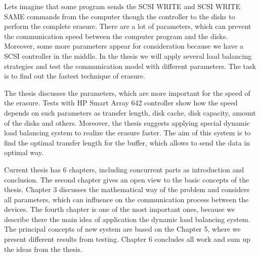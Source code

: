 Lets imagine that some program sends the SCSI WRITE and SCSI WRITE SAME commands from the computer though the controller to the disks to perform the complete erasure. There are a lot of parameters, which can prevent the communication speed between the computer program and the disks. Moreover, some more parameters appear for consideration because we have a SCSI controller in the middle. In the thesis we will apply several load balancing strategies and test the communication model with different parameters. The task is to find out the fastest technique of erasure.

The thesis discusses the parameters, which are more important for the speed of the erasure. Tests with HP Smart Array 642 controller show how the speed depends on such parameters as transfer length, disk cache, disk capacity, amount of the disks and others. Moreover, the thesis suggests applying special dynamic load balancing system to realize the erasure faster. The aim of this system is to find the optimal transfer length for the buffer, which allows to send the data in optimal way. 

Current thesis has 6 chapters, including concurrent parts as introduction and conclusion. The second chapter gives an open view to the basic concepts of the thesis. Chapter 3 discusses the mathematical way of the problem and considers all parameters, which can influence on the communication process between the devices. The fourth chapter is one of the most important ones, because we describe there the main idea of application the dynamic load balancing system. The principal concepts of new system are based on the Chapter 5, where we present different results from testing. Chapter 6 concludes all work and sum up the ideas from the thesis.

